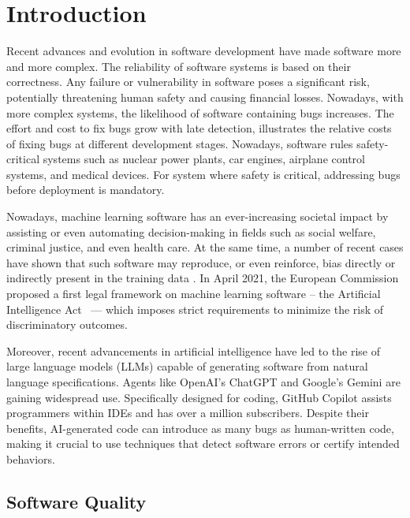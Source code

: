 \chapter{Introduction}

Recent advances and evolution in software development have made software more and more complex.
The reliability of software systems is based on their correctness.
Any failure or vulnerability in software poses a significant risk, potentially threatening human safety and causing financial losses.
Nowadays, with more complex systems, the likelihood of software containing bugs increases.
The effort and cost to fix bugs grow with late detection,  illustrates the relative costs of fixing bugs at different development stages.
Nowadays, software rules safety-critical systems such as nuclear power plants, car engines, airplane control systems, and medical devices.
For system where safety is critical, addressing bugs before deployment is mandatory.


Nowadays, machine learning software has an ever-increasing societal impact by assisting or even automating decision-making in fields such as social welfare, criminal justice, and even health care.
At the same time, a number of recent cases have shown that such software may reproduce, or even reinforce, bias directly or indirectly present in the training data \cite{BuolamwiniGebru2018,KayMatuszek2015,COMPAS,ObermeyerPowers2019}.
In April 2021, the European Commission proposed a first legal framework on machine learning software -- the Artificial Intelligence Act~\cite{ArtIntAct}
--- which imposes strict requirements to minimize the risk of discriminatory outcomes.

Moreover, recent advancements in artificial intelligence have led to the rise of large language models (LLMs) capable of generating software from natural language specifications. Agents like OpenAI's ChatGPT and Google's Gemini are gaining widespread use. Specifically designed for coding, GitHub Copilot assists programmers within IDEs and has over a million subscribers. Despite their benefits, AI-generated code can introduce as many bugs as human-written code, making it crucial to use techniques that detect software errors or certify intended behaviors.

\section{Software Quality}

